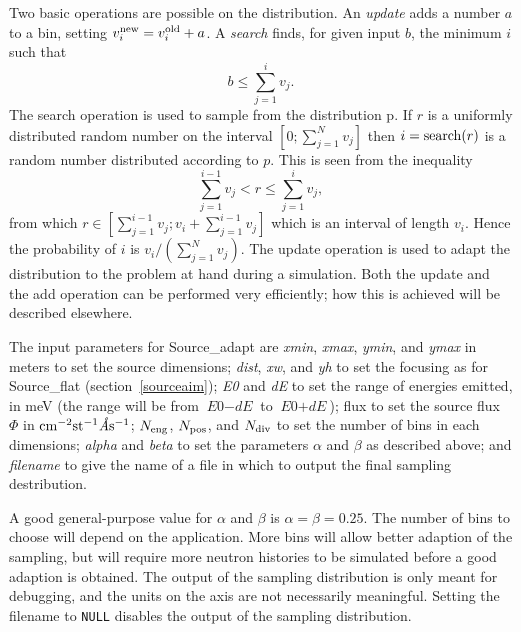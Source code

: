 Two basic operations are possible on the distribution. An \emph{update}
adds a number $a$ to a bin, setting $v_i^{\rm new} = v_i^{\rm old} +
a$. A \emph{search} finds, for given input $b$, the minimum $i$ such
that
$$ b \leq \sum_{j=1}^{i} v_j. $$
The search operation is used to sample from the distribution p. If $r$
is a uniformly distributed random number on the interval
$[0;\sum_{j=1}^N v_j]$ then $i = {\rm search}(r)$ is a random number
distributed according to $p$. This is seen from the inequality
$$ \sum_{j=1}^{i-1} v_j < r \leq \sum_{j=1}^{i} v_j, $$
from which $r \in [\sum_{j=1}^{i-1} v_j; v_i + \sum_{j=1}^{i-1} v_j]$
which is an interval of length $v_i$. Hence the probability of $i$ is
$v_i/(\sum_{j=1}^N v_j)$.
The update operation is used to
adapt the distribution to the problem at hand during a simulation. Both
the update and the add operation can be performed very efficiently; how
this is achieved will be described elsewhere.

The input parameters for Source\_adapt are
\textit{xmin}, \textit{xmax}, \textit{ymin}, and
\textit{ymax} in meters to set the source dimensions;
\textit{dist}, \textit{xw}, and \textit{yh}
to set the focusing as for Source\_flat (section~\ref{sourceaim}); \textit{E0} and
\textit{dE} to set the range of energies emitted, in meV (the range
will be from $\textit{E0} - \textit{dE}$ to
$\textit{E0} + \textit{dE}$); flux to set the source flux $\Phi$ in ${\rm
  cm}^{-2} {\rm st}^{-1} \textit{\AA} {\rm s}^{-1}$;
$N_{\rm eng}$, $N_{\rm pos}$, and $N_{\rm
  div}$ to set the number of bins in each dimensions; \textit{alpha} and
\textit{beta} to set the parameters $\alpha$ and $\beta$ as described
above; and \textit{filename} to give the name of a file in which to
output the final sampling destribution.

A good general-purpose value for $\alpha$ and $\beta$ is $\alpha = \beta
= 0.25$. The number of bins to choose will depend on the
application. More bins will allow better adaption of the sampling, but
will require more neutron histories to be simulated before a good
adaption is obtained. The output of the sampling distribution is only
meant for debugging, and the units on the axis are not necessarily
meaningful. Setting the filename to \verb+NULL+ disables the output of
the sampling distribution.
